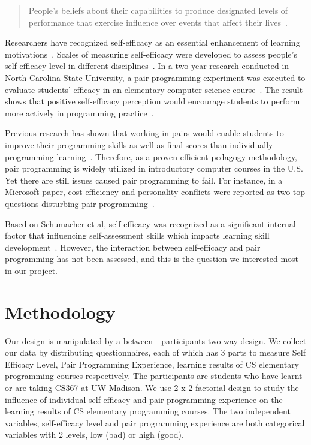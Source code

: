 \documentclass{sigchi}
\begin{document}
\begin{quote}
People's beliefs about their capabilities to produce designated levels of performance that exercise influence over events that affect their lives~\cite{bandura1997self}. 
\end{quote}

Researchers have recognized self-efficacy as an essential enhancement of learning motivations~\cite{zimmerman2000self}. Scales of measuring self-efficacy were developed to assess people's self-efficacy level in different disciplines~\cite{sherer1982self}. In a two-year research conducted in North Carolina State University, a pair programming experiment was executed to evaluate students' efficacy in an elementary computer science course~\cite{williams2001support}. The result shows that positive self-efficacy perception would encourage students to perform more actively in programming practice~\cite{kinnunen2011cs}. 

Previous research has shown that working in pairs would enable students to improve their programming skills as well as final scores than individually programming learning~\cite{williams2000all,mcdowell2002effects,mcdowell2003impact}. Therefore, as a proven efficient pedagogy methodology, pair programming is widely utilized in introductory computer courses in the U.S. Yet there are still issues caused pair programming to fail. For instance, in a Microsoft paper, cost-efficiency and personality conflicts were reported as two top questions disturbing pair programming~\cite{begel2008pair}.

Based on Schumacher et al, self-efficacy was recognized as a significant internal factor that influencing self-assessment skills which impacts learning skill development~\cite{schumacher2013developing}. However, the interaction between self-efficacy and pair programming has not been assessed, and this is the question we interested most in our project.


\section{Methodology}
Our design is manipulated by a between - participants two way design. We collect our data by distributing questionnaires, each of which has 3 parts to measure Self Efficacy Level, Pair Programming Experience, learning results of CS elementary programming courses respectively. The participants are students who have learnt or are taking CS367 at UW-Madison. We use 2 x 2 factorial design to study the influence of individual self-efficacy and pair-programming experience on the learning results of CS elementary programming courses. The two independent variables, self-efficacy level and pair programming experience are both categorical variables with 2 levels, low (bad) or high (good). 
\end{document}
